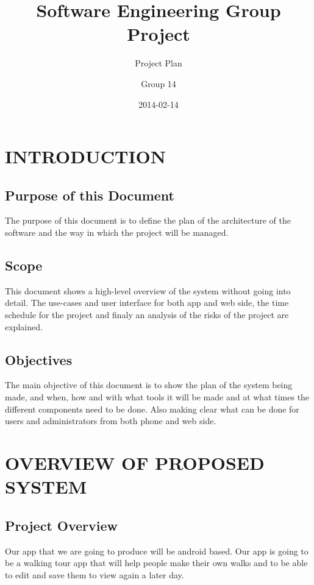 \documentclass{project}
\begin{document}
\title{Software Engineering Group Project}
\subtitle{Project Plan}
\author{Group 14}     
\date{2014-02-14}

\maketitle

\tableofcontents

\newpage

\section{INTRODUCTION}

\subsection{Purpose of this Document}
The purpose of this document is to define the plan of
the architecture of the software and the way in which the
project will be managed.

\subsection{Scope}
This document shows a high-level overview of the system without going into detail. The use-cases and 
user interface for both app and web side, the time schedule for the project
and finaly an analysis of the risks of the project are explained.

\subsection{Objectives}
The main objective of this document is to show the plan of the system
being made, and when, how and with what tools it will be made and at what times
the different components need to be done. Also making clear what can be done
for users and administrators from both phone and web side.

\newpage

\section{OVERVIEW OF PROPOSED SYSTEM}

\subsection{Project Overview}
Our app that we are going to produce will be android based.
Our app is going to be a walking tour app that will help people make their own 
walks and to be able to edit and save them to view again a later day.
\end{document}

